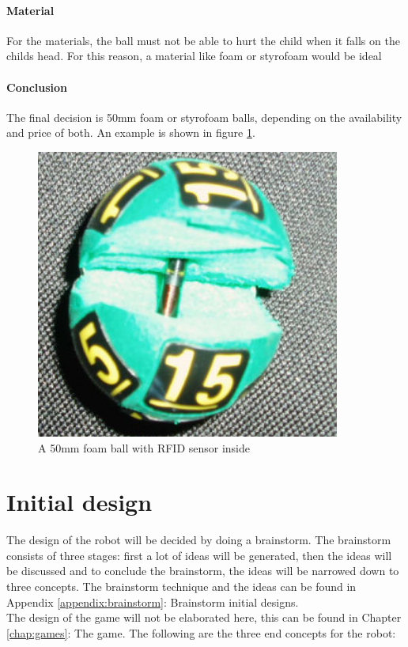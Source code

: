 \documentclass[11pt,twoside,a4paper]{report}
\begin{document}
\subsubsection{Material}
For the materials, the ball must not be able to hurt the child when it falls on the childs head. For this reason, a material like foam or styrofoam would be ideal 
\newpage
\subsubsection{Conclusion}
The final decision is 50mm foam or styrofoam balls, depending on the availability and price of both. An example is shown in figure \ref{figure:lotteryball}.
\begin{figure}[H]
\begin{center}
\includegraphics[width=10cm]{Images/LOTTERY-BALLS-with-rfid.jpg}
\end{center}
\caption{A 50mm foam ball with RFID sensor inside}
\label{figure:lotteryball}
\end{figure}

\chapter{Initial design}
The design of the robot will be decided by doing a brainstorm. The brainstorm consists of three stages: first a lot of ideas will be generated, then the ideas will be discussed and to conclude the brainstorm, the ideas will be narrowed down to three concepts. The brainstorm technique and the ideas can be found in Appendix \ref{appendix:brainstorm}: Brainstorm initial designs. \\
The design of the game will not be elaborated here, this can be found in Chapter \ref{chap:games}: The game. The following are the three end concepts for the robot:
\end{document}
